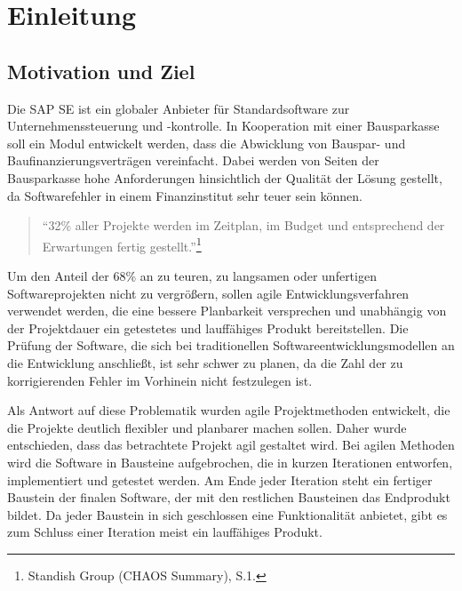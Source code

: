 \chapter{Einleitung}
\label{cha:einleitung}


    \section{Motivation und Ziel}
    \label{sec:motivation}

        Die SAP SE ist ein globaler Anbieter für Standardsoftware zur Unternehmenssteuerung und -kontrolle. In Kooperation mit einer Bausparkasse soll ein Modul entwickelt werden, dass die Abwicklung von Bauspar- und Baufinanzierungsverträgen vereinfacht. Dabei werden von Seiten der Bausparkasse hohe Anforderungen hinsichtlich der Qualität der Lösung gestellt, da Softwarefehler in einem Finanzinstitut sehr teuer sein können.

        \begin{quote}
          \enquote{32\% aller Projekte werden im Zeitplan, im Budget und entsprechend der Erwartungen fertig gestellt.}\footnote{Standish Group (CHAOS Summary), S.1.}
        \end{quote}

        Um den Anteil der 68\% an zu teuren, zu langsamen oder unfertigen Softwareprojekten nicht zu vergrößern, sollen agile Entwicklungsverfahren verwendet werden, die eine bessere Planbarkeit versprechen und unabhängig von der Projektdauer ein getestetes und lauffähiges Produkt bereitstellen. Die Prüfung der Software, die sich bei traditionellen Softwareentwicklungsmodellen an die Entwicklung anschließt, ist sehr schwer zu planen, da die Zahl der zu korrigierenden Fehler im Vorhinein nicht festzulegen ist.

        Als Antwort auf diese Problematik wurden agile Projektmethoden entwickelt, die die Projekte deutlich flexibler und planbarer machen sollen. Daher wurde entschieden, dass das betrachtete Projekt agil gestaltet wird.
        Bei agilen Methoden wird die Software in Bausteine aufgebrochen, die in kurzen Iterationen entworfen, implementiert und getestet werden. Am Ende jeder Iteration steht ein fertiger Baustein der finalen Software, der mit den restlichen Bausteinen das Endprodukt bildet. Da jeder Baustein in sich geschlossen eine Funktionalität anbietet, gibt es zum Schluss einer Iteration meist ein lauffähiges Produkt.

